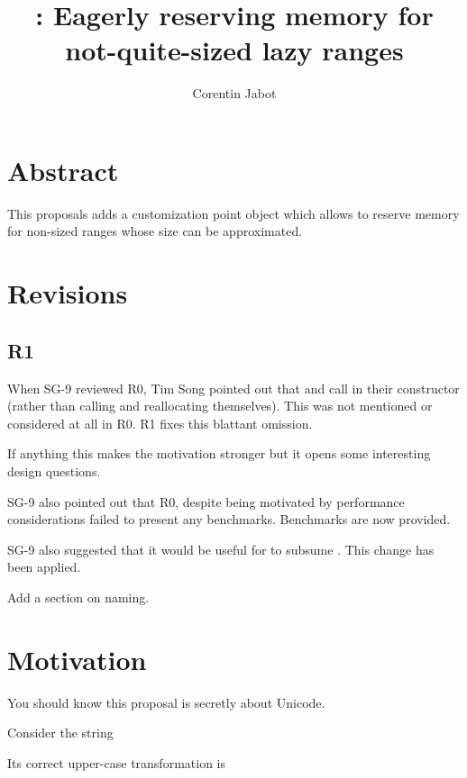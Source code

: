 \documentclass{wg21}
\title{\tcode{size\_hint}: Eagerly reserving memory for not-quite-sized lazy ranges}
\author{Corentin Jabot}{corentin.jabot@gmail.com}
\begin{document}
\maketitle

\section{Abstract}

This proposals adds a  customization point object which allows  to
reserve memory for non-sized ranges whose size can be approximated.

\section{Revisions}

\subsection{R1}

When SG-9 reviewed R0, Tim Song pointed out that  and  call  in their constructor (rather than calling  and reallocating themselves).
This was not mentioned or considered at all in R0. R1 fixes this blattant omission.

If anything this makes the motivation stronger but it opens some interesting design questions.

SG-9 also pointed out that R0, despite being motivated by performance considerations failed to present any benchmarks. Benchmarks are now provided.

SG-9 also suggested that it would be useful for  to subsume .
This change has been applied.

Add a section on naming.

\section{Motivation}

You should know this proposal is secretly about Unicode.

Consider the string


Its correct upper-case transformation is

\end{document}
